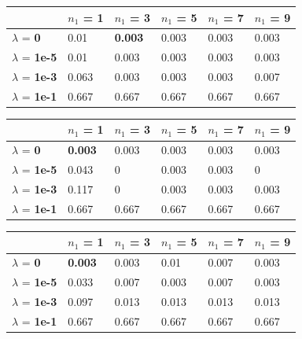 \documentclass[10pt]{article}
\begin{document}
\begin{table}
\centering
\begin{tabular}{llllll}
\toprule
& $n_1$ = \bf{1} & $n_1$ =  \bf{3} & $n_1$ =  \bf{5} & $n_1$ =  \bf{7} & $n_1$ =  \bf{9} \\
\midrule
$\lambda$ = \bf{0} &      0.01  & \bf{0.003} & 0.003 & 0.003 & 0.003 \\
$\lambda$ = \bf{1e-5} &  0.01  & 0.003 & 0.003 & 0.003 & 0.003 \\
$\lambda$ = \bf{1e-3} &  0.063 & 0.003 & 0.003 & 0.003 & 0.007 \\
$\lambda$ = \bf{1e-1} &  0.667 & 0.667 & 0.667 & 0.667 & 0.667 \\
\bottomrule
\end{tabular}
\end{table}

\begin{table}
\centering
\begin{tabular}{llllll}
\toprule
& $n_1$ = \bf{1} & $n_1$ =  \bf{3} & $n_1$ =  \bf{5} & $n_1$ =  \bf{7} & $n_1$ =  \bf{9} \\
\midrule
$\lambda$ = \bf{0} &       \bf{0.003} & 0.003 & 0.003 & 0.003 & 0.003 \\
$\lambda$ = \bf{1e-5} &   0.043 & 0     & 0.003 & 0.003 & 0     \\
$\lambda$ = \bf{1e-3} &   0.117 & 0     & 0.003 & 0.003 & 0.003 \\
$\lambda$ = \bf{1e-1} &   0.667 & 0.667 & 0.667 & 0.667 & 0.667 \\
\bottomrule
\end{tabular}
\end{table}
	
\begin{table}
\centering
\begin{tabular}{llllll}
\toprule
& $n_1$ = \bf{1} & $n_1$ =  \bf{3} & $n_1$ =  \bf{5} & $n_1$ =  \bf{7} & $n_1$ =  \bf{9} \\
\midrule
$\lambda$ = \bf{0} &        \bf{0.003} & 0.003 & 0.01  & 0.007 & 0.003 \\
$\lambda$ = \bf{1e-5} &    0.033 & 0.007 & 0.003 & 0.007 & 0.003 \\
$\lambda$ = \bf{1e-3} &    0.097 & 0.013 & 0.013 & 0.013 & 0.013 \\
$\lambda$ = \bf{1e-1} &    0.667 & 0.667 & 0.667 & 0.667 & 0.667 \\
\bottomrule
\end{tabular}
\end{table}
\end{document}
